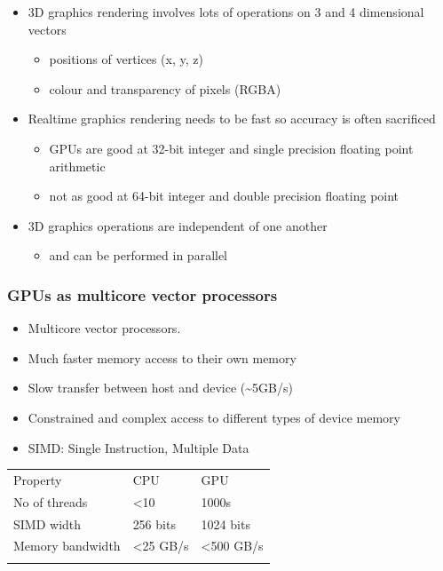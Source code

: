 \begin{itemize}
\itemsep1pt\parskip0pt
\item
  3D graphics rendering involves lots of operations on 3 and 4
  dimensional vectors

  \begin{itemize}
  \itemsep1pt\parskip0pt
  \item
    positions of vertices (x, y, z)
  \item
    colour and transparency of pixels (RGBA)
  \end{itemize}
\item
  Realtime graphics rendering needs to be fast so accuracy is often
  sacrificed

  \begin{itemize}
  \itemsep1pt\parskip0pt
  \item
    GPUs are good at 32-bit integer and single precision floating point
    arithmetic
  \item
    not as good at 64-bit integer and double precision floating point
  \end{itemize}
\item
  3D graphics operations are independent of one another

  \begin{itemize}
  \itemsep1pt\parskip0pt
  \item
    and can be performed in parallel
  \end{itemize}
\end{itemize}

\subsubsection{GPUs as multicore vector
processors}\label{gpus-as-multicore-vector-processors}

\begin{itemize}
\itemsep1pt\parskip0pt
\item
  Multicore vector processors.
\item
  Much faster memory access to their own memory
\item
  Slow transfer between host and device (\textasciitilde{}5GB/s)
\item
  Constrained and complex access to different types of device memory
\item
  SIMD: Single Instruction, Multiple Data
\end{itemize}

\begin{longtable}[c]{@{}lll@{}}
\toprule\addlinespace
Property & CPU & GPU
\\\addlinespace
\midrule\endhead
No of threads & \textless{}10 & 1000s
\\\addlinespace
SIMD width & 256 bits & 1024 bits
\\\addlinespace
Memory bandwidth & \textless{}25 GB/s & \textless{}500 GB/s
\\\addlinespace
\bottomrule
\end{longtable}

